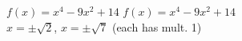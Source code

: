 {$f(x) = x^4-9x^2+14$}
{$f(x) = x^4-9x^2+14$ \\ $x = \pm \sqrt{2}$, $x = \pm \sqrt{7}$ (each has mult. 1)}